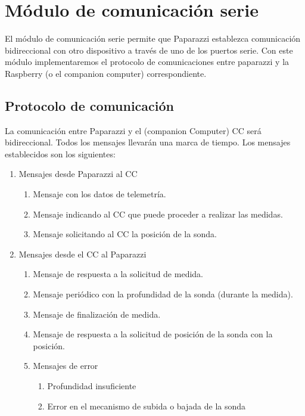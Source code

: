 \chapter{Módulo de comunicación serie}

El módulo de comunicación serie permite que Paparazzi establezca comunicación bidireccional con otro dispositivo a través de uno de los puertos serie. Con este módulo implementaremos el protocolo de comunicaciones entre paparazzi y la Raspberry (o el companion computer) correspondiente.

\section{Protocolo de comunicación}\label{sec:1}

La comunicación entre Paparazzi y el (companion Computer) CC será bidireccional. Todos los mensajes llevarán una marca de tiempo. Los mensajes establecidos son los siguientes:
\begin{enumerate}
	\item Mensajes desde Paparazzi al CC
	\begin{enumerate}
		\item Mensaje con los datos de telemetría. 
		\item Mensaje indicando al CC que puede proceder a realizar las medidas.
		\item Mensaje solicitando al CC la posición de la sonda.
	\end{enumerate}
	\item Mensajes desde el CC al Paparazzi
	\begin{enumerate}
			\item Mensaje de respuesta a la solicitud de medida.
			\item Mensaje periódico con la profundidad de la sonda (durante la medida).
			\item Mensaje de finalización de medida.
			\item Mensaje de respuesta a la solicitud de posición de la sonda con la posición.
			 \item Mensajes de error
			 \begin{enumerate}
			 	\item Profundidad insuficiente
			 	\item Error en el mecanismo de subida o bajada de la sonda	
			 \end{enumerate}
	\end{enumerate}	
\end{enumerate}

